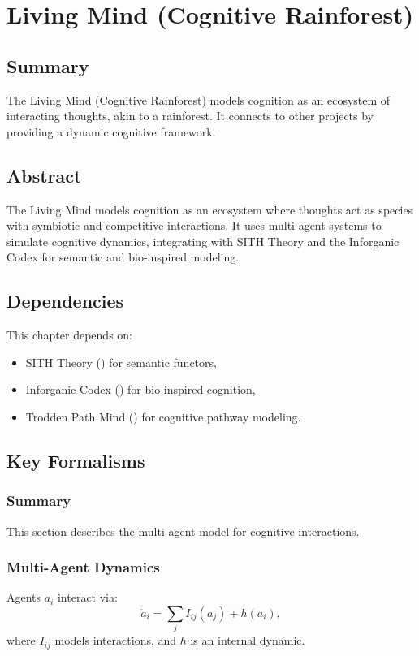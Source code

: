 \documentclass[11pt,oneside]{memoir}
\theoremstyle{plain}
\begin{document}
\chapter{Living Mind (Cognitive Rainforest)}
\label{sec:living_mind}

\section{Summary}
The Living Mind (Cognitive Rainforest) models cognition as an ecosystem of interacting thoughts, akin to a rainforest. It connects to other projects by providing a dynamic cognitive framework.

\section{Abstract}
The Living Mind models cognition as an ecosystem where thoughts act as species with symbiotic and competitive interactions. It uses multi-agent systems to simulate cognitive dynamics, integrating with SITH Theory and the Inforganic Codex for semantic and bio-inspired modeling.

\section{Dependencies}
This chapter depends on:
\begin{itemize}
    \item SITH Theory () for semantic functors,
    \item Inforganic Codex () for bio-inspired cognition,
    \item Trodden Path Mind () for cognitive pathway modeling.
\end{itemize}

\section{Key Formalisms}
\subsection{Summary}
This section describes the multi-agent model for cognitive interactions.

\subsection{Multi-Agent Dynamics}
Agents \(a_i\) interact via:
\begin{equation}
    \dot{a}_i = \sum_{j} I_{ij}(a_j) + h(a_i),
\end{equation}
where \(I_{ij}\) models interactions, and \(h\) is an internal dynamic.
\end{document}
